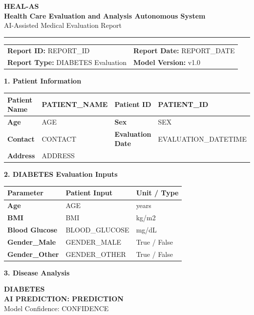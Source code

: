 \documentclass[11pt,a4paper]{article}
\newcommand{\sectiontitle}[1]{\vspace{8pt}\noindent\colorbox{HealBlue}{\parbox{\dimexpr\linewidth-2\fboxsep}{\color{white}\textbf{\large #1}}}\vspace{5pt}}
\begin{document}
\begin{center}
{\Huge\textbf{\color{HealBlue}HEAL-AS}}\\[3pt]
{\large\textbf{Health Care Evaluation and Analysis Autonomous System}}\\[3pt]
{\small AI-Assisted Medical Evaluation Report}\\[6pt]
\rule{\linewidth}{1pt}
\end{center}
\begin{tabularx}{\linewidth}{X X}
\textbf{Report ID:} {{REPORT_ID}} & \textbf{Report Date:} {{REPORT_DATE}}\\
\textbf{Report Type:} DIABETES Evaluation & \textbf{Model Version:} v1.0
\end{tabularx}

\sectiontitle{1. Patient Information}
\begin{tabularx}{\linewidth}{|l|X|l|X|}
\hline
\textbf{Patient Name} & {{PATIENT_NAME}} & \textbf{Patient ID} & {{PATIENT_ID}} \\ \hline
\textbf{Age} & {{AGE}} & \textbf{Sex} & {{SEX}} \\ \hline
\textbf{Contact} & {{CONTACT}} & \textbf{Evaluation Date} & {{EVALUATION_DATETIME}} \\ \hline
\textbf{Address} & \multicolumn{3}{l|}{{ADDRESS}} \\ \hline
\end{tabularx}

\sectiontitle{2. DIABETES Evaluation Inputs}
\begin{tabularx}{\linewidth}{|X|X|X|}
\hline
\textbf{Parameter} & \textbf{Patient Input} & \textbf{Unit / Type}\\ \hline
\textbf{Age} & {{AGE}} & years\\ \hline
\textbf{BMI} & {{BMI}} & kg/m2\\ \hline
\textbf{Blood Glucose} & {{BLOOD_GLUCOSE}} & mg/dL\\ \hline
\textbf{Gender\_Male} & {{GENDER_MALE}} & True / False\\ \hline
\textbf{Gender\_Other} & {{GENDER_OTHER}} & True / False\\ \hline
\end{tabularx}

\sectiontitle{3. Disease Analysis}
\begin{tcolorbox}[colback=HealLight,colframe=HealBlue,halign=center]
{\Large\textbf{DIABETES}}\\[6pt]
{\Large\textbf{AI PREDICTION: {{PREDICTION}}}}\\[5pt]
Model Confidence: {{CONFIDENCE}}
\end{tcolorbox}
\end{document}
